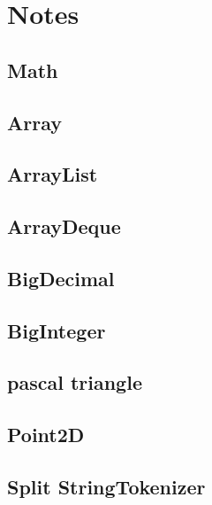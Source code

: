 \section{Notes}
    \subsection{Math}
        

    \subsection{Array}
            
    \subsection{ArrayList}
        
    \subsection{ArrayDeque}
             

    \subsection{BigDecimal}
         
    \subsection{BigInteger}
            
    
    \subsection{pascal triangle}
            

    \subsection{Point2D}
        

    \subsection{Split StringTokenizer}
        
